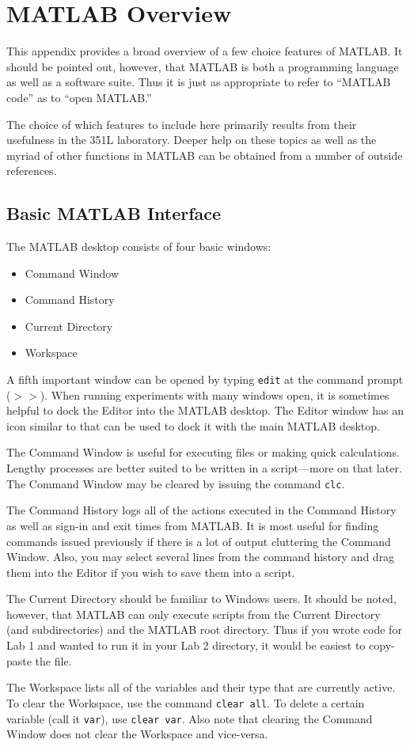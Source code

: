\appendix
\chapter{MATLAB Overview} \label{app:matlaboverview}

This appendix provides a broad overview of a few choice features of MATLAB.  It should be pointed out, however, that MATLAB is both a programming language as well as a software suite.  Thus it is just as appropriate to refer to ``MATLAB code'' as to ``open MATLAB.''
\par
The choice of which features to include here primarily results from their usefulness in the 351L laboratory.  Deeper help on these topics as well as the myriad of other functions in MATLAB can be obtained from a number of outside references.

\section{Basic MATLAB Interface}
The MATLAB desktop consists of four basic windows:
\begin{itemize}
    \item Command Window
    \item Command History
    \item Current Directory
    \item Workspace
\end{itemize}
A fifth important window can be opened by typing \verb=edit= at the command prompt ($>>$).  When running experiments with many windows open, it is sometimes helpful to dock the Editor into the MATLAB desktop.  The Editor window has an icon similar to  that can be used to dock it with the main MATLAB desktop.
\par
The Command Window is useful for executing files or making quick calculations.  Lengthy processes are better suited to be written in a script---more on that later.  The Command Window may be cleared by issuing the command \verb=clc=.
\par
The Command History logs all of the actions executed in the Command History as well as sign-in and exit times from MATLAB.  It is most useful for finding commands issued previously if there is a lot of output cluttering the Command Window.  Also, you may select several lines from the command history and drag them into the Editor if you wish to save them into a script.
\par
The Current Directory should be familiar to Windows users.  It should be noted, however, that MATLAB can only execute scripts from the Current Directory (and subdirectories) and the MATLAB root directory.  Thus if you wrote code for Lab 1 and wanted to run it in your Lab 2 directory, it would be easiest to copy-paste the file.
\par
The Workspace lists all of the variables and their type that are currently active.  To clear the Workspace, use the command \verb=clear all=.  To delete a certain variable (call it \verb=var=), use \verb=clear var=.  Also note that clearing the Command Window does not clear the Workspace and vice-versa.

